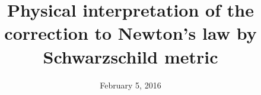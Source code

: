 \documentclass[a4paper,10pt]{article}
\begin{document}
\title{Physical interpretation of the correction to Newton's
       law by Schwarzschild metric}
\author{}
\date{February 5, 2016}
\maketitle
\tableofcontents
 










\newpage
\thispagestyle{empty}


\nocite{*}

\end{document}
